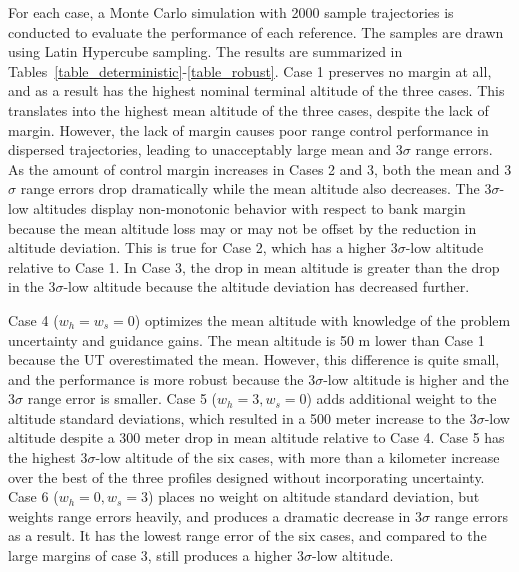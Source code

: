 \documentclass[journal ]{new-aiaa}
\begin{document}
For each case, a Monte Carlo simulation with 2000 sample trajectories is conducted to evaluate the performance of each reference. The samples are drawn using Latin Hypercube sampling. The results are summarized in Tables~\ref{table_deterministic}-\ref{table_robust}. Case 1 preserves no margin at all, and as a result has the highest nominal terminal altitude of the three cases. This translates into the highest mean altitude of the three cases, despite the lack of margin. However, the lack of margin causes poor range control performance in dispersed trajectories, leading to unacceptably large mean and 3$\sigma$ range errors. As the amount of control margin increases in Cases 2 and 3, both the mean and 3$\sigma$ range errors drop dramatically while the mean altitude also decreases. The 3$\sigma$-low altitudes display non-monotonic behavior with respect to bank margin because the mean altitude loss may or may not be offset by the reduction in altitude deviation. This is true for Case 2, which has a higher 3$\sigma$-low altitude relative to Case 1. In Case 3, the drop in mean altitude is greater than the drop in the 3$\sigma$-low altitude because the altitude deviation has decreased further. 

Case 4 ($ w_h=w_s=0 $) optimizes the mean altitude with knowledge of the problem uncertainty and guidance gains. The mean altitude is 50 m lower than Case 1 because the UT overestimated the mean. However, this difference is quite small, and the performance is more robust because the 3$\sigma$-low altitude is higher and the 3$\sigma$ range error is smaller. Case 5 ($ w_h=3,w_s=0 $) adds additional weight to the altitude standard deviations, which resulted in a 500 meter increase to the 3$\sigma$-low altitude despite a 300 meter drop in mean altitude relative to Case 4. Case 5 has the highest 3$\sigma$-low altitude of the six cases, with more than a kilometer increase over the best of the three profiles designed without incorporating uncertainty. Case 6 ($ w_h=0, w_s=3$) places no weight on altitude standard deviation, but weights range errors heavily, and produces a dramatic decrease in 3$\sigma$ range errors as a result. It has the lowest range error of the six cases, and compared to the large margins of case 3, still produces a higher 3$\sigma$-low altitude.
\end{document}
